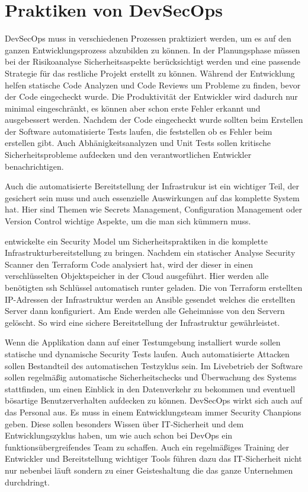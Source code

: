 \section{Praktiken von DevSecOps}
DevSecOps muss in verschiedenen Prozessen praktiziert werden, um es auf den ganzen Entwicklungsprozess abzubilden zu können.
In der Planungsphase müssen bei der Risikoanalyse Sicherheitsaspekte berücksichtigt werden und eine passende Strategie für das restliche Projekt erstellt zu können.
Während der Entwicklung helfen statische Code Analyzen und Code Reviews um Probleme zu finden, bevor der Code eingecheckt wurde. Die Produktivität der Entwickler wird dadurch nur minimal eingeschränkt, es können aber schon erste Fehler erkannt und ausgebessert werden.
Nachdem der Code eingecheckt wurde sollten beim Erstellen der Software automatisierte Tests laufen, die feststellen ob es Fehler beim erstellen gibt. Auch Abhänigkeitsanalyzen und Unit Tests sollen kritische Sicherheitsprobleme aufdecken und den verantwortlichen Entwickler benachrichtigen.

Auch die automatisierte Bereitstellung der Infrastrukur ist ein wichtiger Teil, der gesichert sein muss und auch essenzielle Auswirkungen auf das komplette System hat.
Hier sind Themen wie Secrets Management, Configuration Management oder Version Control wichtige Aspekte, um die man sich kümmern muss.\cite{grey}

\cite{security-model} entwickelte ein Security Model um Sicherheitspraktiken in die komplette Infrastrukturbereitstellung zu bringen. Nachdem ein statischer Analyse Security Scanner den Terraform Code analysiert hat, wird der dieser in einen verschlüsselten Objektspeicher in der Cloud ausgeführt. Hier werden alle benötigten \ac{ssh} Schlüssel automatisch runter geladen. Die von Terraform erstellten IP-Adressen der Infrastruktur werden an Ansible gesendet welches die erstellten Server dann konfiguriert. Am Ende werden alle Geheimnisse von den Servern gelöscht. So wird eine sichere Bereitstellung der Infrastruktur gewährleistet.

Wenn die Applikation dann auf einer Testumgebung installiert wurde sollen statische und dynamische Security Tests laufen. Auch automatisierte Attacken sollen Bestandteil des automatischen Testzyklus sein.
Im Livebetrieb der Software sollen regelmäßig automatische Sicherheitschecks und Überwachung des Systems stattfinden, um einen Einblick in den Datenverkehr zu bekommen und eventuell bösartige Benutzerverhalten aufdecken zu können.
DevSecOps wirkt sich auch auf das Personal aus. Es muss in einem Entwicklungsteam immer \glqq Security Chanpions\grqq \cite{grey} geben. Diese sollen besonders Wissen über IT-Sicherheit und dem Entwicklungszyklus haben, um wie auch schon bei DevOps ein funktionsübergreifendes Team zu schaffen.
Auch ein regelmäßiges Training der Entwickler und Bereitstellung wichtiger Tools führen dazu das IT-Sicherheit nicht nur nebenbei läuft sondern zu einer Geisteshaltung die das ganze Unternehmen durchdringt.

